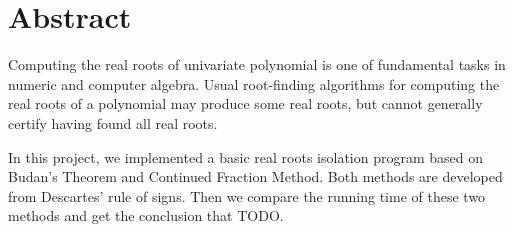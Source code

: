 \section{Abstract}

Computing the real roots of univariate polynomial is one of fundamental tasks in
numeric and computer algebra. Usual root-finding algorithms for computing the
real roots of a polynomial may produce some real roots, but cannot generally
certify having found all real roots.

In this project, we implemented a basic real roots isolation program based on
Budan's Theorem and Continued Fraction Method. Both methods are developed from 
Descartes' rule of signs. Then we compare the running time of these two methods
and get the conclusion that TODO.

